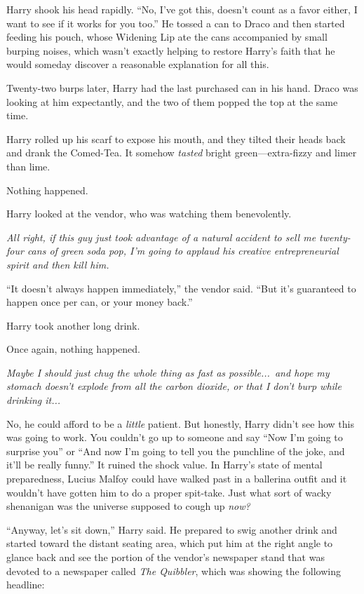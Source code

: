 Harry shook his head rapidly. “No, I’ve got this, doesn’t count as a favor either, I want to see if it works for you too.” He tossed a can to Draco and then started feeding his pouch, whose Widening Lip ate the cans accompanied by small burping noises, which wasn’t exactly helping to restore Harry’s faith that he would someday discover a reasonable explanation for all this.

Twenty-two burps later, Harry had the last purchased can in his hand. Draco was looking at him expectantly, and the two of them popped the top at the same time.

Harry rolled up his scarf to expose his mouth, and they tilted their heads back and drank the Comed-Tea. It somehow \emph{tasted} bright green—extra-fizzy and limer than lime.

Nothing happened.

Harry looked at the vendor, who was watching them benevolently.

\emph{All right, if this guy just took advantage of a natural accident to sell me twenty-four cans of green soda pop, I’m going to applaud his creative entrepreneurial spirit and then kill him.}

“It doesn’t always happen immediately,” the vendor said. “But it’s guaranteed to happen once per can, or your money back.”

Harry took another long drink.

Once again, nothing happened.

\emph{Maybe I should just chug the whole thing as fast as possible...\ and hope my stomach doesn’t explode from all the carbon dioxide, or that I don’t burp while drinking it...}

No, he could afford to be a \emph{little} patient. But honestly, Harry didn’t see how this was going to work. You couldn’t go up to someone and say “Now I’m going to surprise you” or “And now I’m going to tell you the punchline of the joke, and it’ll be really funny.” It ruined the shock value. In Harry’s state of mental preparedness, Lucius Malfoy could have walked past in a ballerina outfit and it wouldn’t have gotten him to do a proper spit-take. Just what sort of wacky shenanigan was the universe supposed to cough up \emph{now?}

“Anyway, let’s sit down,” Harry said. He prepared to swig another drink and started toward the distant seating area, which put him at the right angle to glance back and see the portion of the vendor’s newspaper stand that was devoted to a newspaper called \emph{The Quibbler}, which was showing the following headline:

